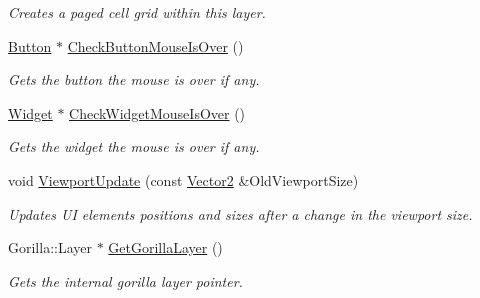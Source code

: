 \begin{DoxyCompactItemize}
\begin{DoxyCompactList}\small\item\em Creates a paged cell grid within this layer. \item\end{DoxyCompactList}\item 
\hyperlink{classphys_1_1UI_1_1Button}{Button} $\ast$ \hyperlink{classphys_1_1UI_1_1Layer_a3d401a77704cba509b418c53f92cc09d}{CheckButtonMouseIsOver} ()
\begin{DoxyCompactList}\small\item\em Gets the button the mouse is over if any. \item\end{DoxyCompactList}\item 
\hyperlink{classphys_1_1UI_1_1Widget}{Widget} $\ast$ \hyperlink{classphys_1_1UI_1_1Layer_ae80bef48442ac0737bfc1939fc2f9af1}{CheckWidgetMouseIsOver} ()
\begin{DoxyCompactList}\small\item\em Gets the widget the mouse is over if any. \item\end{DoxyCompactList}\item 
void \hyperlink{classphys_1_1UI_1_1Layer_a832101f21d8601f296782fc24ac02705}{ViewportUpdate} (const \hyperlink{classphys_1_1Vector2}{Vector2} \&OldViewportSize)
\begin{DoxyCompactList}\small\item\em Updates UI elements positions and sizes after a change in the viewport size. \item\end{DoxyCompactList}\item 
\hypertarget{classphys_1_1UI_1_1Layer_a6528081453b4f2be4d7a4ad8878edbf0}{
Gorilla::Layer $\ast$ \hyperlink{classphys_1_1UI_1_1Layer_a6528081453b4f2be4d7a4ad8878edbf0}{GetGorillaLayer} ()}
\label{dd/d5b/classphys_1_1UI_1_1Layer_a6528081453b4f2be4d7a4ad8878edbf0}

\begin{DoxyCompactList}\small\item\em Gets the internal gorilla layer pointer. \item\end{DoxyCompactList}\end{DoxyCompactItemize}
